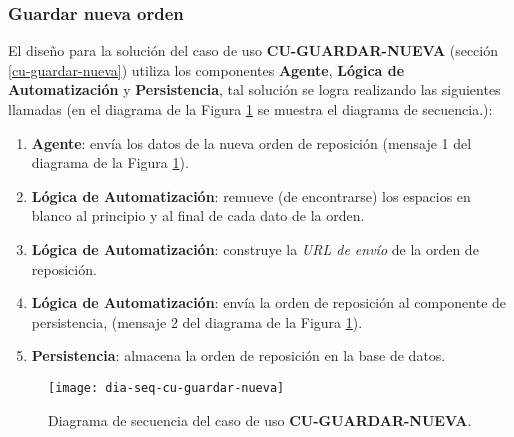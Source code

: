 \subsubsection{Guardar nueva orden}
El diseño para la solución del caso de uso \textbf{CU-GUARDAR-NUEVA} (sección \ref{cu-guardar-nueva}) utiliza los componentes \textbf{Agente}, \textbf{Lógica de Automatización} y \textbf{Persistencia}, tal solución se logra realizando las siguientes llamadas (en el diagrama de la Figura \ref{fig:dia-seq-cu-guardar-nueva} se muestra el diagrama de secuencia.):
\begin{enumerate}
	\item \textbf{Agente}: envía los datos de la nueva orden de reposición (mensaje 1 del diagrama de la Figura \ref{fig:dia-seq-cu-guardar-nueva}).
	\item \textbf{Lógica de Automatización}: remueve (de encontrarse) los espacios en blanco al principio y al final de cada dato de la orden.
	\item \textbf{Lógica de Automatización}: construye la \textit{URL de envío} de la orden de reposición.
	\item \textbf{Lógica de Automatización}: envía la orden de reposición al componente de persistencia, (mensaje 2 del diagrama de la Figura \ref{fig:dia-seq-cu-guardar-nueva}).
	\item \textbf{Persistencia}: almacena la orden de reposición en la base de datos.
\end{enumerate}

\begin{figure}[h]
	\centering
	\texttt{[image: dia-seq-cu-guardar-nueva]}
	\caption{Diagrama de secuencia del caso de uso \textbf{CU-GUARDAR-NUEVA}.}
	\label{fig:dia-seq-cu-guardar-nueva}
\end{figure}

